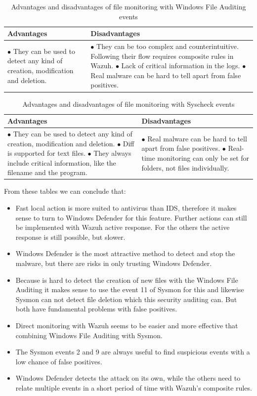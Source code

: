 \begin{table}[H]
	\begin{tabularx}{\textwidth}{|w|w|}
		\hline
		Advantages & Disadvantages\\ \hline
			$\bullet$ They can be used to detect any kind of creation, modification and deletion.
		&
			$\bullet$ They can be too complex and counterintuitive. Following their flow requires composite rules in Wazuh.
			\linej $\bullet$ Lack of critical information in the logs.
			\linej $\bullet$ Real malware can be hard to tell apart from false positives.
			\\ \hline
	\end{tabularx}
	\caption{Advantages and disadvantages of file monitoring with Windows File Auditing events}
\end{table}

\begin{table}[H]
	\begin{tabularx}{\textwidth}{|w|w|}
		\hline
		Advantages & Disadvantages\\ \hline
			$\bullet$ They can be used to detect any kind of creation, modification and deletion.
			\linej $\bullet$ Diff is supported for text files.
			\linej $\bullet$ They always include critical information, like the filename and the program.
		&
			$\bullet$ Real malware can be hard to tell apart from false positives.
			\linej $\bullet$ Real-time monitoring can only be set for folders, not files individually.
			\\ \hline
	\end{tabularx}
	\caption{Advantages and disadvantages of file monitoring with Syscheck events}
\end{table}
\linej
From these tables we can conclude that:
\begin{itemize}
	\item Fast local action is more suited to antivirus than IDS, therefore it makes sense to turn to Windows Defender for this feature. Further actions can still be implemented with Wazuh active response. For the others the active response is still possible, but slower.
	\item Windows Defender is the most attractive method to detect and stop the malware, but there are risks in only trusting Windows Defender.
	\item Because is hard to detect the creation of new files with the Windows File Auditing it makes sense to use the event 11 of Sysmon for this and likewise Sysmon can not detect file deletion which this security auditing can. But both have fundamental problems with false positives.
	\item Direct monitoring with Wazuh seems to be easier and more effective that combining Windows File Auditing with Sysmon.
	\item The Sysmon events 2 and 9 are always useful to find suspicious events with a low chance of false positives.
	\item Windows Defender detects the attack on its own, while the others need to relate multiple events in a short period of time with Wazuh's composite rules.
\end{itemize}

